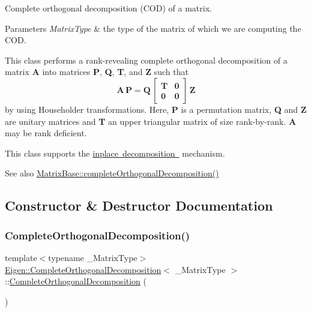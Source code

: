 Complete orthogonal decomposition (C\+OD) of a matrix. 


\begin{DoxyParams}{Parameters}
{\em Matrix\+Type} & the type of the matrix of which we are computing the C\+OD.\\
\hline
\end{DoxyParams}
This class performs a rank-\/revealing complete orthogonal decomposition of a matrix {\bfseries{A}} into matrices {\bfseries{P}}, {\bfseries{Q}}, {\bfseries{T}}, and {\bfseries{Z}} such that \[ \mathbf{A} \, \mathbf{P} = \mathbf{Q} \, \begin{bmatrix} \mathbf{T} & \mathbf{0} \\ \mathbf{0} & \mathbf{0} \end{bmatrix} \, \mathbf{Z} \] by using Householder transformations. Here, {\bfseries{P}} is a permutation matrix, {\bfseries{Q}} and {\bfseries{Z}} are unitary matrices and {\bfseries{T}} an upper triangular matrix of size rank-\/by-\/rank. {\bfseries{A}} may be rank deficient.

This class supports the \mbox{\hyperlink{}{inplace decomposition }} mechanism.

\begin{DoxySeeAlso}{See also}
\mbox{\hyperlink{class_eigen_1_1_matrix_base_ae90b6846f05bd30b8d52b66e427e3e09}{Matrix\+Base\+::complete\+Orthogonal\+Decomposition()}} 
\end{DoxySeeAlso}


\subsection{Constructor \& Destructor Documentation}
\mbox{\label{class_eigen_1_1_complete_orthogonal_decomposition_a7ba33814fd3fdc62f6179cdcd655c679}} 
\subsubsection{\texorpdfstring{CompleteOrthogonalDecomposition()}{CompleteOrthogonalDecomposition()}\hspace{0.1cm}{\footnotesize\ttfamily [1/4]}}
{\footnotesize\ttfamily template$<$typename \+\_\+\+Matrix\+Type$>$ \\
\mbox{\hyperlink{class_eigen_1_1_complete_orthogonal_decomposition}{Eigen\+::\+Complete\+Orthogonal\+Decomposition}}$<$ \+\_\+\+Matrix\+Type $>$\+::\mbox{\hyperlink{class_eigen_1_1_complete_orthogonal_decomposition}{Complete\+Orthogonal\+Decomposition}} (\begin{DoxyParamCaption}{ }\end{DoxyParamCaption})\hspace{0.3cm}{\ttfamily [inline]}}



